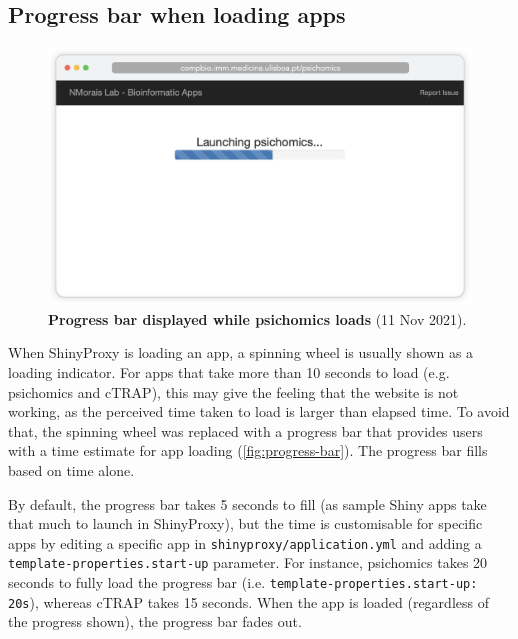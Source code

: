 \subsection{Progress bar when loading apps}

\begin{figure}
  \vspace{-\intextsep}
  \includegraphics[width=\linewidth]{images/app-server/progress-bar}
  \caption[Screenshot of app loading]{\textbf{Progress bar displayed while psichomics loads} (11 Nov 2021).}
  \label{fig:progress-bar}
  \vspace{-\intextsep}
\end{figure}


When ShinyProxy is loading an app, a spinning wheel is usually shown as a loading indicator. For apps that take more than 10 seconds to load (e.g. psichomics and cTRAP), this may give the feeling that the website is not working, as the perceived time taken to load is larger than elapsed time. %
To avoid that, the spinning wheel was replaced with a progress bar that provides users with a time estimate for app loading (\autoref{fig:progress-bar}). The progress bar fills based on time alone.

By default, the progress bar takes 5 seconds to fill (as sample Shiny apps take that much to launch in ShinyProxy), but the time is customisable for specific apps by editing a specific app in \texttt{shinyproxy/application.yml} and adding a \texttt{template-properties.start-up} parameter. For instance, psichomics takes 20 seconds to fully load the progress bar (i.e. \texttt{template-properties.start-up: 20s}), whereas cTRAP takes 15 seconds. When the app is loaded (regardless of the progress shown), the progress bar fades out.

